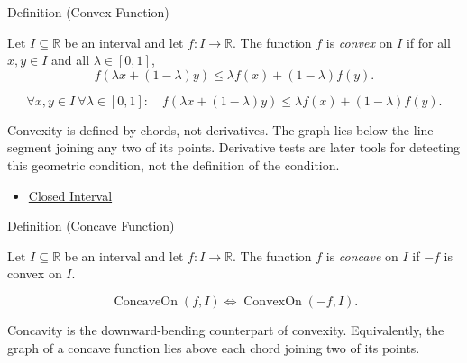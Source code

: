 

\begin{definitionbox}{Definition (Convex Function)}
\begin{definition}
\label{def:convex-function}
Let $I\subseteq\mathbb{R}$ be an interval and let $f:I\to\mathbb{R}$. The function $f$ is \emph{convex} on $I$ if for all $x,y\in I$ and all $\lambda\in[0,1]$,
\[
  f(\lambda x+(1-\lambda)y)
  \leq
  \lambda f(x)+(1-\lambda)f(y).
\]
\end{definition}
\end{definitionbox}

\begin{remark*}
\[
  \forall x,y\in I\ \forall\lambda\in[0,1]:\quad
  f(\lambda x+(1-\lambda)y)
  \leq
  \lambda f(x)+(1-\lambda)f(y).
\]
\end{remark*}

\begin{remark*}[Interpretation]
Convexity is defined by chords, not derivatives. The graph lies below the line segment joining any two of its points. Derivative tests are later tools for detecting this geometric condition, not the definition of the condition.
\end{remark*}

\begin{dependencies}
\begin{itemize}
  \item \hyperref[def:closed-interval]{Closed Interval}
\end{itemize}
\end{dependencies}

\begin{definitionbox}{Definition (Concave Function)}
\begin{definition}
\label{def:concave-function}
Let $I\subseteq\mathbb{R}$ be an interval and let $f:I\to\mathbb{R}$. The function $f$ is \emph{concave} on $I$ if $-f$ is convex on $I$.
\end{definition}
\end{definitionbox}

\begin{remark*}
\[
  \operatorname{ConcaveOn}(f,I)
  \Longleftrightarrow
  \operatorname{ConvexOn}(-f,I).
\]
\end{remark*}

\begin{remark*}[Interpretation]
Concavity is the downward-bending counterpart of convexity. Equivalently, the graph of a concave function lies above each chord joining two of its points.
\end{remark*}


